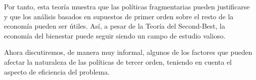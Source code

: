 \documentclass[10pt,a4paper]{article}
\begin{document}
Por tanto, esta teoría muestra que las políticas fragmentarias pueden justificarse y que los análisis basados en supuestos de primer orden sobre el resto de la economía pueden ser útiles. Así, a pesar de la Teoría del Second-Best, la economía del bienestar puede seguir siendo un campo de estudio valioso.

Ahora discutiremos, de manera muy informal, algunos de los factores que pueden afectar la naturaleza de las políticas de tercer orden, teniendo en cuenta el aspecto de eficiencia del problema. 
\end{document}
